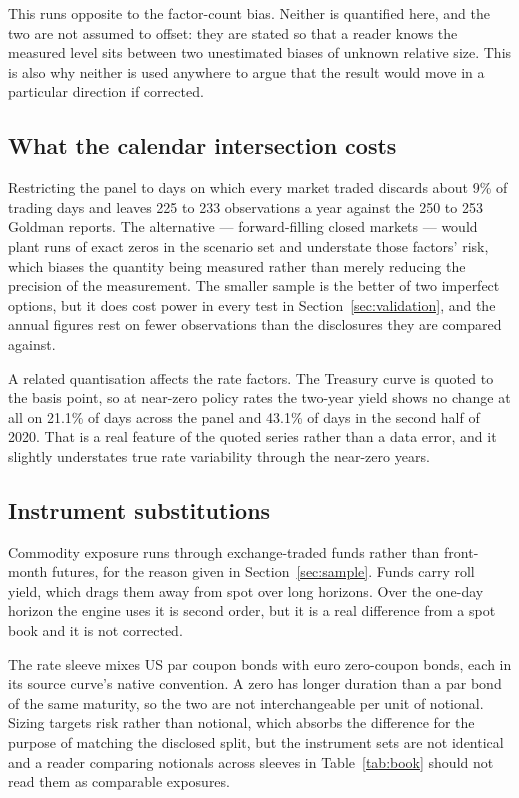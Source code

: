 This runs opposite to the factor-count bias. Neither is quantified here, and
the two are not assumed to offset: they are stated so that a reader knows the
measured level sits between two unestimated biases of unknown relative size.
This is also why neither is used anywhere to argue that the result would move
in a particular direction if corrected.

\subsection{What the calendar intersection costs}

Restricting the panel to days on which every market traded discards about 9\%
of trading days and leaves 225 to 233 observations a year against the 250 to
253 Goldman reports. The alternative --- forward-filling closed markets ---
would plant runs of exact zeros in the scenario set and understate those
factors' risk, which biases the quantity being measured rather than merely
reducing the precision of the measurement. The smaller sample is the better of
two imperfect options, but it does cost power in every test in
Section~\ref{sec:validation}, and the annual figures rest on fewer observations
than the disclosures they are compared against.

A related quantisation affects the rate factors. The Treasury curve is quoted
to the basis point, so at near-zero policy rates the two-year yield shows no
change at all on 21.1\% of days across the panel and 43.1\% of days in the
second half of 2020. That is a real feature of the quoted series rather than a
data error, and it slightly understates true rate variability through the
near-zero years.

\subsection{Instrument substitutions}

Commodity exposure runs through exchange-traded funds rather than front-month
futures, for the reason given in Section~\ref{sec:sample}. Funds carry roll
yield, which drags them away from spot over long horizons. Over the one-day
horizon the engine uses it is second order, but it is a real difference from a
spot book and it is not corrected.

The rate sleeve mixes US par coupon bonds with euro zero-coupon bonds, each in
its source curve's native convention. A zero has longer duration than a par
bond of the same maturity, so the two are not interchangeable per unit of
notional. Sizing targets risk rather than notional, which absorbs the
difference for the purpose of matching the disclosed split, but the instrument
sets are not identical and a reader comparing notionals across sleeves in
Table~\ref{tab:book} should not read them as comparable exposures.

